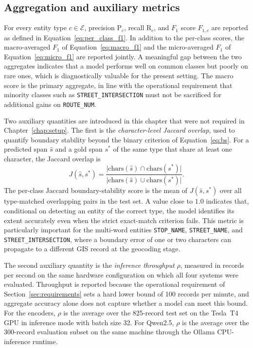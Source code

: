 \subsection{Aggregation and auxiliary metrics}
\label{sec:agg_aux}

For every entity type $c \in \mathcal{E}$, precision $\mathrm{P}_c$, recall $\mathrm{R}_c$, and $F_1$ score $F_{1,c}$ are reported as defined in Equation~\eqref{eq:per_class_f1}. In addition to the per-class scores, the macro-averaged $F_1$ of Equation~\eqref{eq:macro_f1} and the micro-averaged $F_1$ of Equation~\eqref{eq:micro_f1} are reported jointly. A meaningful gap between the two aggregates indicates that a model performs well on common classes but poorly on rare ones, which is diagnostically valuable for the present setting. The macro score is the primary aggregate, in line with the operational requirement that minority classes such as \texttt{STREET\_INTERSECTION} must not be sacrificed for additional gains on \texttt{ROUTE\_NUM}.

Two auxiliary quantities are introduced in this chapter that were not required in Chapter~\ref{chap:setup}. The first is the \emph{character-level Jaccard overlap}, used to quantify boundary stability beyond the binary criterion of Equation~\eqref{eq:bs}. For a predicted span $\hat{s}$ and a gold span $s^{*}$ of the same type that share at least one character, the Jaccard overlap is
\begin{equation}
  J(\hat{s}, s^{*}) = \frac{\bigl| \mathrm{chars}(\hat{s}) \cap \mathrm{chars}(s^{*}) \bigr|}{\bigl| \mathrm{chars}(\hat{s}) \cup \mathrm{chars}(s^{*}) \bigr|}.
  \label{eq:jaccard}
\end{equation}
The per-class Jaccard boundary-stability score is the mean of $J(\hat{s}, s^{*})$ over all type-matched overlapping pairs in the test set. A value close to $1.0$ indicates that, conditional on detecting an entity of the correct type, the model identifies its extent accurately even when the strict exact-match criterion fails. This metric is particularly important for the multi-word entities \texttt{STOP\_NAME}, \texttt{STREET\_NAME}, and \texttt{STREET\_INTERSECTION}, where a boundary error of one or two characters can propagate to a different GIS record at the geocoding stage.

The second auxiliary quantity is the \emph{inference throughput} $\rho$, measured in records per second on the same hardware configuration on which all four systems were evaluated. Throughput is reported because the operational requirement of Section~\ref{sec:requirements} sets a hard lower bound of 100 records per minute, and aggregate accuracy alone does not capture whether a model can meet this bound. For the encoders, $\rho$ is the average over the 825-record test set on the Tesla~T4 GPU in inference mode with batch size 32. For Qwen2.5, $\rho$ is the average over the 300-record evaluation subset on the same machine through the Ollama CPU-inference runtime.

